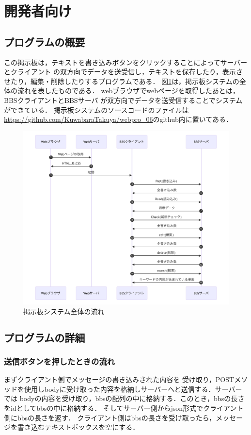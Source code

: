 \documentclass{jsarticle}
\begin{document}
\clearpage
\section*{開発者向け}
\subsection*{プログラムの概要}
この掲示板は，テキストを書き込みボタンをクリックすることによってサーバーとクライアント
の双方向でデータを送受信し，テキストを保存したり，表示させたり，編集・削除したりするプログラムである．
図\ref{システム}は，掲示板システムの全体の流れを表したものである．
webブラウザでwebページを取得したあとは，BBSクライアントとBBSサーバ
が双方向でデータを送受信することでシステムができている．
掲示板システムのソースコードのファイルは\url{https://github.com/KuwabaraTakuya/webpro_06}のgithub内に置いてある．
\begin{figure}[h]
    \centering
    \includegraphics[width=120mm]{fig/system.pdf}
    \caption{掲示板システム全体の流れ}
    \label{システム}
\end{figure}
\subsection*{プログラムの詳細}
\subsubsection*{送信ボタンを押したときの流れ}
まずクライアント側でメッセージの書き込みされた内容を
受け取り，POSTメソッドを使用しbodyに受け取った内容を格納しサーバーへと送信する．サーバーでは
bodyの内容を受け取り，bbsの配列の中に格納する．このとき，bbsの長さをidとしてbbsの中に格納する．
そしてサーバー側からjson形式でクライアント側にbbsの長さを返す．
クライアント側はbbsの長さを受け取ったら，メッセージを書き込むテキストボックスを空にする．
\end{document}
